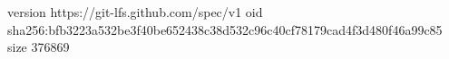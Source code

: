 version https://git-lfs.github.com/spec/v1
oid sha256:bfb3223a532be3f40be652438c38d532c96c40cf78179cad4f3d480f46a99c85
size 376869
